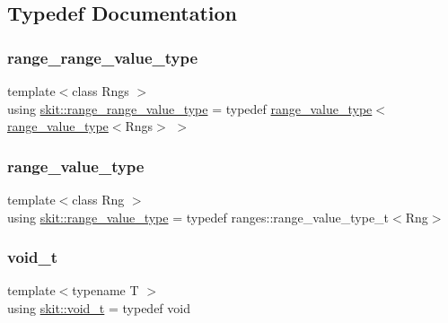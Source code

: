 \subsection{Typedef Documentation}
\mbox{\label{namespaceskit_a018f1a68fe40fa3792a5038ef842e116}} 
\subsubsection{\texorpdfstring{range\+\_\+range\+\_\+value\+\_\+type}{range\_range\_value\_type}}
{\footnotesize\ttfamily template$<$class Rngs $>$ \\
using \hyperlink{namespaceskit_a018f1a68fe40fa3792a5038ef842e116}{skit\+::range\+\_\+range\+\_\+value\+\_\+type} = typedef \hyperlink{namespaceskit_ab6185faee3b25c70e0b355c7ce30a8ed}{range\+\_\+value\+\_\+type}$<$\hyperlink{namespaceskit_ab6185faee3b25c70e0b355c7ce30a8ed}{range\+\_\+value\+\_\+type}$<$Rngs$>$ $>$}

\mbox{\label{namespaceskit_ab6185faee3b25c70e0b355c7ce30a8ed}} 
\subsubsection{\texorpdfstring{range\+\_\+value\+\_\+type}{range\_value\_type}}
{\footnotesize\ttfamily template$<$class Rng $>$ \\
using \hyperlink{namespaceskit_ab6185faee3b25c70e0b355c7ce30a8ed}{skit\+::range\+\_\+value\+\_\+type} = typedef ranges\+::range\+\_\+value\+\_\+type\+\_\+t$<$Rng$>$}

\mbox{\label{namespaceskit_a827cfc47784c1ce9cc3e7c583ac3b1cb}} 
\subsubsection{\texorpdfstring{void\+\_\+t}{void\_t}}
{\footnotesize\ttfamily template$<$typename T $>$ \\
using \hyperlink{namespaceskit_a827cfc47784c1ce9cc3e7c583ac3b1cb}{skit\+::void\+\_\+t} = typedef void}



